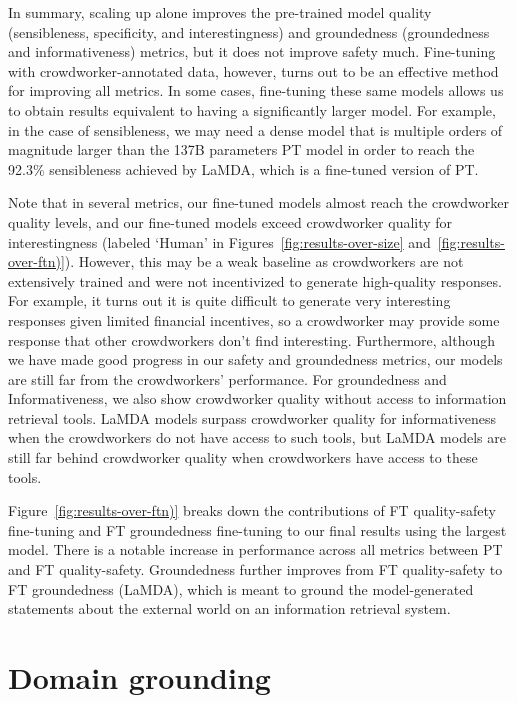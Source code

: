 In summary, scaling up alone improves the pre-trained model quality (sensibleness, specificity, and interestingness) and groundedness (groundedness and informativeness) metrics, but it does not improve safety much. Fine-tuning with crowdworker-annotated data, however, turns out to be an effective method for improving all metrics. In some cases, fine-tuning these same models allows us to obtain results equivalent to having a significantly larger model. For example, in the case of sensibleness, we may need a dense model that is multiple orders of magnitude larger than the 137B parameters PT model in order to reach the 92.3\% sensibleness achieved by LaMDA, which is a fine-tuned version of PT.

Note that in several metrics, our fine-tuned models almost reach the crowdworker quality levels, and our fine-tuned models exceed crowdworker quality for interestingness (labeled `Human' in Figures~\ref{fig:results-over-size} and~\ref{fig:results-over-ftn)}). However, this may be a weak baseline as crowdworkers are not extensively trained and were not incentivized to generate high-quality responses. For example, it turns out it is quite difficult to generate very interesting responses given limited financial incentives, so a crowdworker may provide some response that other crowdworkers don't find interesting. Furthermore, although we have made good progress in our safety and groundedness metrics, our models are still far from the crowdworkers' performance. For groundedness and Informativeness, we also show crowdworker quality without access to information retrieval tools. LaMDA models surpass crowdworker quality for informativeness when the crowdworkers do not have access to such tools, but LaMDA models are still far behind crowdworker quality when crowdworkers have access to these tools.

Figure~\ref{fig:results-over-ftn)} breaks down the contributions of FT quality-safety fine-tuning and FT groundedness fine-tuning to our final results using the largest model. There is a notable increase in performance across all metrics between PT and FT quality-safety. Groundedness further improves from FT quality-safety to FT groundedness (LaMDA), which is meant to ground the model-generated statements about the external world on an information retrieval system.

\section{Domain grounding}
\label{sec:domain-grounding}

